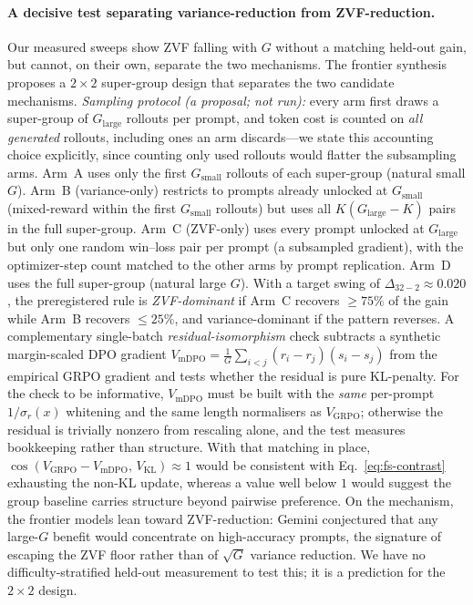 \paragraph{A decisive test separating variance-reduction from ZVF-reduction.}
Our measured sweeps show ZVF falling with $G$ without a matching held-out
gain, but cannot, on their own, separate the two mechanisms. The frontier synthesis proposes a $2{\times}2$
super-group design that separates the two candidate mechanisms.
\emph{Sampling protocol (a proposal; not run):} every arm first
draws a super-group of $G_\mathrm{large}$ rollouts per prompt, and
token cost is counted on \emph{all generated} rollouts, including
ones an arm discards---we state this accounting choice explicitly,
since counting only used rollouts would flatter the subsampling
arms. Arm~A uses only the first $G_\mathrm{small}$ rollouts of
each super-group (natural small $G$). Arm~B (variance-only)
restricts to prompts already unlocked at $G_\mathrm{small}$
(mixed-reward within the first $G_\mathrm{small}$ rollouts) but
uses all $K(G_\mathrm{large}{-}K)$ pairs in the full super-group.
Arm~C (ZVF-only) uses every prompt unlocked at
$G_\mathrm{large}$ but only one random win--loss pair per prompt
(a subsampled gradient), with the optimizer-step count matched
to the other arms by prompt replication. Arm~D uses the full
super-group (natural large $G$). With a target swing of
$\Delta_{32-2}\approx 0.020$, the preregistered rule is
\emph{ZVF-dominant} if Arm~C recovers $\ge 75\%$ of the gain while
Arm~B recovers $\le 25\%$, and variance-dominant if the pattern
reverses. A complementary single-batch \emph{residual-isomorphism}
check subtracts a synthetic margin-scaled DPO gradient
$V_\text{mDPO}=\tfrac{1}{G}\sum_{i<j}(r_i-r_j)(s_i-s_j)$ from the
empirical GRPO gradient and tests whether the residual is pure
KL-penalty. For the check to be informative, $V_\text{mDPO}$ must
be built with the \emph{same} per-prompt $1/\sigma_r(x)$ whitening
and the same length normalisers as $V_\text{GRPO}$; otherwise the
residual is trivially nonzero from rescaling alone, and the test
measures bookkeeping rather than structure. With that matching in
place, $\cos(V_\text{GRPO}-V_\text{mDPO},\,V_\text{KL})\approx1$
would be consistent with Eq.~\eqref{eq:fs-contrast} exhausting
the non-KL update, whereas a value well below $1$ would suggest
the group baseline carries structure beyond pairwise preference.
On the mechanism, the frontier models lean toward ZVF-reduction:
Gemini conjectured that any large-$G$ benefit would concentrate on
high-accuracy prompts, the signature of escaping the ZVF floor rather than of
$\sqrt{G}$ variance reduction. We have no difficulty-stratified held-out
measurement to test this; it is a prediction for the $2{\times}2$ design.

